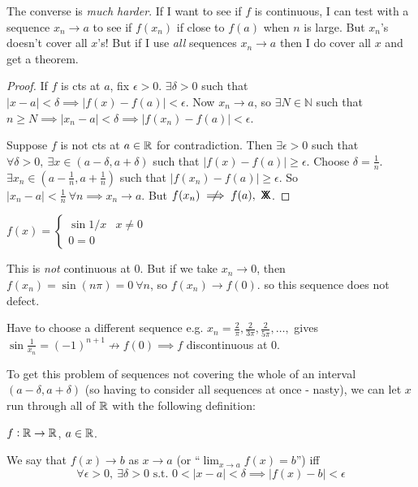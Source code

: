 \documentclass[10pt,twoside]{scrartcl}
\newcommand*{\cont}{%
  \mathsf{X}\mkern-8.5mu\mathsf{X}%
}
\begin{document}
The converse is \emph{much harder}. If I want to see if $f$ is continuous, I can test with a sequence $x_n \to a$ to see if $f(x_n)$ if close to $f(a)$ when $n$ is large. But $x_n$'s doesn't cover all $x$'s! But if I use \emph{all} sequences $x_n \to a$ then I do cover all $x$ and get a theorem. 

\begin{proof}
If $f$ is cts at $a$, fix $\epsilon >0$. $\exists \delta > 0$ such that $|x-a| < \delta \implies |f(x) - f(a)| < \epsilon$. Now $x_n \to a$, so $\exists N \in \mathbb{N}$ such that $n \geq N \implies |x_n - a| < \delta \implies |f(x_n) - f(a)| < \epsilon$.

 Suppose $f$ is not cts at $a\in \mathbb{R}$ for contradiction. Then $\exists \epsilon >0$ such that $\forall \delta >0,~\exists x \in (a-\delta,a+\delta)$ such that $|f(x) -f(a)| \geq \epsilon$. Choose $\delta = \frac{1}{n}$. $\exists x_n \in (a - \frac{1}{n},a + \frac{1}{n})$ such that $|f(x_n) - f(a)| \geq \epsilon$. So $|x_n-a| < \frac{1}{n}~\forall n \implies x_n \to a$. But $f(x_n) \centernot\implies f(a),~\cont$.  
\end{proof}\vspace*{5pt}

\begin{example}
$f(x) =\begin{cases}
\sin 1/x & x \neq 0\\
0 = 0
\end{cases}
$	

This is \emph{not} continuous at $0$. But if we take $x_n \to 0$, then $f(x_n) = \sin(n\pi) = 0~\forall n$, so $f(x_n)\to f(0)$. so this sequence does not defect. 

Have to choose a different sequence e.g. $x_n = \frac{2}{\pi},\frac{2}{3\pi},\frac{2}{5\pi},\dots,$ gives $\sin\frac{1}{x_n} = (-1)^{n+1} \not\to f(0) \implies f$ discontinuous at $0$.  
\end{example}

To get this problem of sequences not covering the whole of an interval $(a-\delta, a+\delta)$ (so having to consider all sequences at once - nasty), we can let $x$ run through all of $\mathbb{R}$ with the following definition:\\

\begin{definition}
$f: \mathbb{R}\to \mathbb{R}$, $a\in\mathbb{R}$. 

We say that $f(x) \to b$ as $x \to a$ (or ``$\lim_{x\to a} f(x) = b$'') iff 
\[\forall \epsilon >0,~\exists \delta > 0 \text{ s.t. } 0 < |x-a| < \delta \implies |f(x) - b| < \epsilon\]	
\end{definition}
\end{document}
